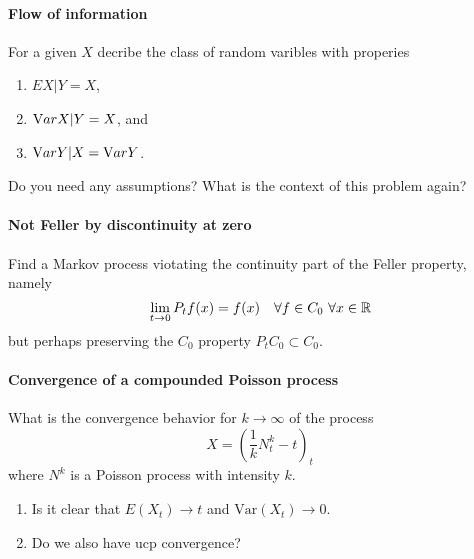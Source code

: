\paragraph{Flow of information}
For a given $X$ decribe the class of random varibles with properies
\begin{enumerate}
\item $E X|Y = X$,
\item $\textrm Var X|Y = X$, and
\item $\textrm Var Y|X = \textrm Var Y$.
\end{enumerate}

Do you need any assumptions? What is the context of this problem again?  




\paragraph{Not Feller by discontinuity at zero}
Find a Markov process viotating the continuity part of 
the Feller property, namely
\begin{equation}
\lim_{t\to 0} P_t f(x) = f(x) \quad \forall f \in C_0 \ \forall x\in \mathbb R
\end{equation}
but perhaps preserving the $C_0$ property $P_t C_0 \subset C_0$.







\paragraph{Convergence of a compounded Poisson process}
What is the convergence behavior for $k\to \infty$ of the process 
\begin{equation}
X = \left(  \frac{1}{k} N_t^k - t  \right)_t
\end{equation}
where $N^k$ is a Poisson process with intensity $k$. 

\begin{enumerate}
\item Is it clear that $E\left( X_t \right) \to t$ and $\textrm{Var} \left( X_t \right)\to 0$.
\item Do we also have ucp convergence?
\end{enumerate}









